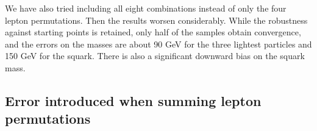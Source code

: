 \documentclass[twoside,english]{uiofysmaster}
\begin{document}
We have also tried including all eight combinations instead of only the four lepton permutations. Then the results worsen considerably. While the robustness against starting points is retained, only half of the samples obtain convergence, and the errors on the masses are about 90 GeV for the three lightest particles and 150 GeV for the squark. There is also a significant downward bias on the squark mass.

\subsection{Error introduced when summing lepton permutations}
\end{document}
